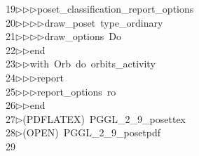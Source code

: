 \begin{tabbing}
19\>$\triangleright$\>$\triangleright$\>$\triangleright$\>poset\_classification\_report\_options\ \\[0pt]
20\>$\triangleright$\>$\triangleright$\>$\triangleright$\>$\triangleright$\>draw\_poset\ type\_ordinary\ \\[0pt]
21\>$\triangleright$\>$\triangleright$\>$\triangleright$\>$\triangleright$\>draw\_options\ Do\ \\[0pt]
22\>$\triangleright$\>$\triangleright$\>end\ \\[0pt]
23\>$\triangleright$\>$\triangleright$\>with\ Orb\ do\ orbits\_activity\ \\[0pt]
24\>$\triangleright$\>$\triangleright$\>$\triangleright$\>report\ \ \\[0pt]
25\>$\triangleright$\>$\triangleright$\>$\triangleright$\>report\_options\ ro\ \\[0pt]
26\>$\triangleright$\>$\triangleright$\>end\ \\[0pt]
27\>$\triangleright$\>(PDFLATEX)\ PGGL\_2\_9\_posettex\\[0pt]
28\>$\triangleright$\>(OPEN)\ PGGL\_2\_9\_posetpdf\\[0pt]
29\>\end{tabbing}
